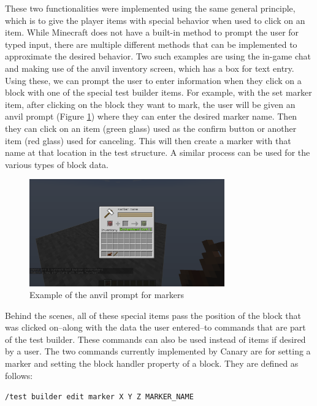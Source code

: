 \documentclass[12pt]{article}
\def\code#1{\texttt{#1}}
\begin{document}
\begin{onehalfspacing}
These two functionalities were implemented using the same general
principle, which is to give the player items with special behavior when
used to click on an item. While Minecraft does not have a built-in
method to prompt the user for typed input, there are multiple different
methods that can be implemented to approximate the desired behavior. Two
such examples are using the in-game chat and making use of the anvil
inventory screen, which has a box for text entry. Using these, we can
prompt the user to enter information when they click on a block with one
of the special test builder items. For example, with the set marker
item, after clicking on the block they want to mark, the user will be
given an anvil prompt (Figure \ref{fig:4_1_4}) where they can enter the desired
marker name. Then they can click on an item (green glass) used as the
confirm button or another item (red glass) used for canceling. This will
then create a marker with that name at that location in the test
structure. A similar process can be used for the various types of block
data.

\begin{figure}[h] 
    \centering
    \includegraphics[width=0.75\textwidth]{media/media/image8.png} 
    \caption{Example of the anvil prompt for markers} 
    \label{fig:4_1_4}  
\end{figure}


Behind the scenes, all of these special items pass the position of the
block that was clicked on--along with the data the user entered--to
commands that are part of the test builder. These commands can also be
used instead of items if desired by a user. The two commands currently
implemented by Canary are for setting a marker and setting the block
handler property of a block. They are defined as follows:

\noindent\code{/test builder edit marker X Y Z MARKER\_NAME}


\end{onehalfspacing}
\end{document}
